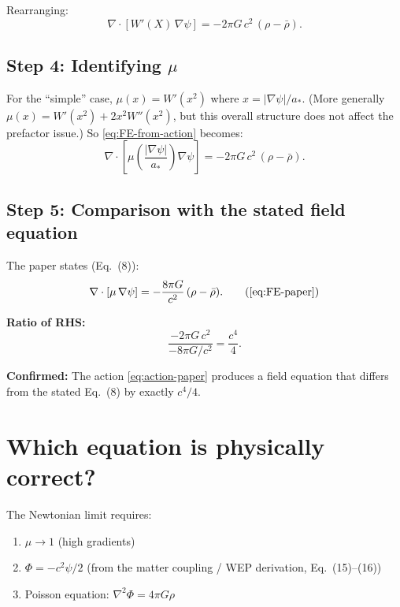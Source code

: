 \documentclass[aps,prd,twocolumn,nofootinbib]{revtex4-2}
\begin{document}
Rearranging:
\begin{equation}
\boxed{
\nabla\cdot\!\left[W'(X)\,\nabla\psi\right]
= -2\pi G\,c^2\,(\rho - \bar\rho).
}
\label{eq:FE-from-action}
\end{equation}

\subsection{Step 4: Identifying $\mu$}

For the ``simple'' case, $\mu(x) = W'(x^2)$ where $x = |\nabla\psi|/a_*$.
(More generally $\mu(x) = W'(x^2) + 2x^2 W''(x^2)$, but this overall
structure does not affect the prefactor issue.) So \eqref{eq:FE-from-action}
becomes:
\begin{equation}
\nabla\cdot\!\left[\mu\!\left(\frac{|\nabla\psi|}{a_*}\right)\nabla\psi\right]
= -2\pi G\,c^2\,(\rho - \bar\rho).
\label{eq:FE-derived}
\end{equation}

\subsection{Step 5: Comparison with the stated field equation}

The paper states (Eq.~(8)):
\begin{equation}
\nabla\cdot[\mu\,\nabla\psi] = -\frac{8\pi G}{c^2}\,(\rho - \bar\rho).
\tag{\ref{eq:FE-paper}}
\end{equation}

\textbf{Ratio of RHS:}
\begin{equation}
\frac{-2\pi G\,c^2}{-8\pi G/c^2} = \frac{c^4}{4}.
\end{equation}

\textbf{Confirmed:} The action \eqref{eq:action-paper} produces a field
equation that differs from the stated Eq.~(8) by exactly $c^4/4$.

\section{Which equation is physically correct?}
\label{sec:physics}

The Newtonian limit requires:
\begin{enumerate}
\item $\mu \to 1$ (high gradients)
\item $\Phi = -c^2\psi/2$ (from the matter coupling / WEP derivation, Eq.~(15)--(16))
\item Poisson equation: $\nabla^2\Phi = 4\pi G\rho$
\end{enumerate}
\end{document}
